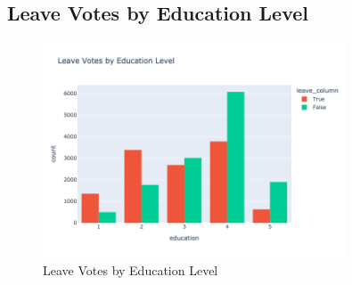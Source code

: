 \documentclass{article}
\begin{document}
\subsection*{Leave Votes by Education Level}
\begin{figure}[H]
    \centering
    \includegraphics[width=0.8\textwidth]{leave_votes_by_education.png}
    \caption{Leave Votes by Education Level}
\end{figure}
\end{document}
